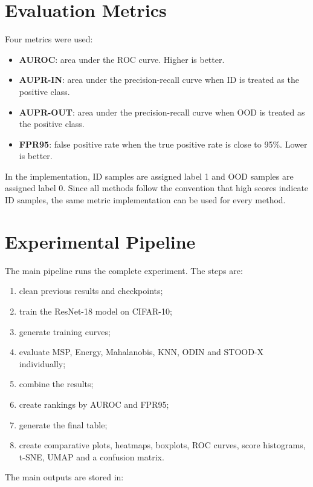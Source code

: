 \documentclass[11pt,a4paper]{article}
\begin{document}
\section{Evaluation Metrics}

Four metrics were used:

\begin{itemize}
    \item \textbf{AUROC}: area under the ROC curve. Higher is better.
    \item \textbf{AUPR-IN}: area under the precision-recall curve when ID is treated as the positive class.
    \item \textbf{AUPR-OUT}: area under the precision-recall curve when OOD is treated as the positive class.
    \item \textbf{FPR95}: false positive rate when the true positive rate is close to 95\%. Lower is better.
\end{itemize}

In the implementation, ID samples are assigned label 1 and OOD samples are assigned label 0.
Since all methods follow the convention that high scores indicate ID samples, the same metric implementation can be used for every method.

\section{Experimental Pipeline}

The main pipeline runs the complete experiment.
The steps are:

\begin{enumerate}
    \item clean previous results and checkpoints;
    \item train the ResNet-18 model on CIFAR-10;
    \item generate training curves;
    \item evaluate MSP, Energy, Mahalanobis, KNN, ODIN and STOOD-X individually;
    \item combine the results;
    \item create rankings by AUROC and FPR95;
    \item generate the final table;
    \item create comparative plots, heatmaps, boxplots, ROC curves, score histograms, t-SNE, UMAP and a confusion matrix.
\end{enumerate}

The main outputs are stored in:
\end{document}
